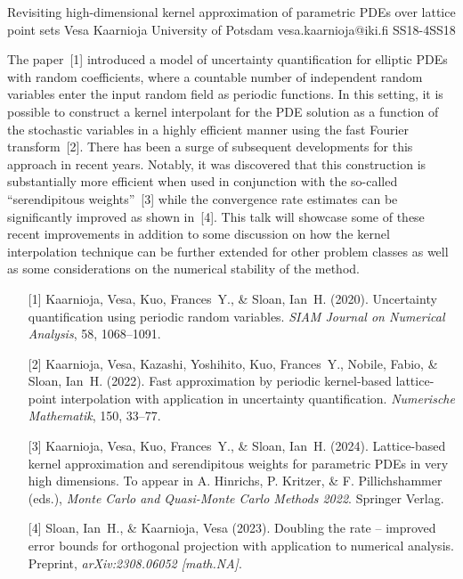\begin{talk}
  {Revisiting high-dimensional kernel approximation of parametric PDEs over lattice point sets}%
  {Vesa Kaarnioja}%
  {University of Potsdam}%
  {vesa.kaarnioja@iki.fi}%
  {}%
{}{}{SS18-4}{SS18}

			
The paper~[1] introduced a model of uncertainty quantification for elliptic PDEs with random coefficients, where a countable number of independent random variables enter the input random field as periodic functions. In this setting, it is possible to construct a kernel interpolant for the PDE solution as a function of the stochastic variables in a highly efficient manner using the fast Fourier transform~[2]. There has been a surge of subsequent developments for this approach in recent years. Notably, it was discovered that this construction is substantially more efficient when used in conjunction with the so-called ``serendipitous weights''~[3] while the convergence rate estimates can be significantly improved as shown in~[4]. This talk will showcase some of these recent improvements in addition to some discussion on how the kernel interpolation technique can be further extended for other problem classes as well as some considerations on the numerical stability of the method.
\begin{enumerate}
	\item[{[1]}] Kaarnioja, Vesa, Kuo, Frances~Y., \& Sloan, Ian~H. (2020). Uncertainty quantification using periodic random variables. {\it SIAM Journal on Numerical Analysis}, 58, 1068--1091.
    \item[{[2]}] Kaarnioja, Vesa, Kazashi, Yoshihito, Kuo, Frances~Y., Nobile, Fabio, \& Sloan, Ian~H. (2022). Fast approximation by periodic kernel-based lattice-point interpolation with application in uncertainty quantification. {\it Numerische Mathematik}, 150, 33--77.
	\item[{[3]}] Kaarnioja, Vesa, Kuo, Frances~Y., \& Sloan, Ian~H. (2024). Lattice-based kernel approximation and serendipitous weights for parametric PDEs in very high dimensions. To appear in A. Hinrichs, P. Kritzer, \& F. Pillichshammer (eds.), {\it Monte Carlo and Quasi-Monte Carlo Methods 2022}. Springer Verlag.
	\item[{[4]}] Sloan, Ian~H., \& Kaarnioja, Vesa (2023). Doubling the rate -- improved error bounds for orthogonal projection with application to numerical analysis. Preprint, {\it arXiv:2308.06052 [math.NA]}.
\end{enumerate}
\end{talk}

